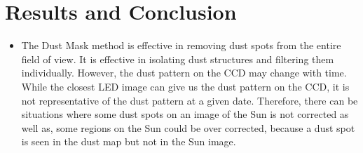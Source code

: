 \documentclass[11pt,a4paper]{article}
\begin{document}
	\section{Results and Conclusion}
	\begin{itemize}
		\item The Dust Mask method is effective in removing dust spots from the entire field of view. It is effective in isolating dust structures and filtering them individually. However, the dust pattern on the CCD may change with time. While the closest LED image can give us the dust pattern on the CCD, it is not representative of the dust pattern at a given date. Therefore, there can be situations where some dust spots on an image of the Sun is not corrected as well as, some regions on the Sun could be over corrected, because a dust spot is seen in the dust map but not in the Sun image.
	\end{itemize}
	
\end{document}
